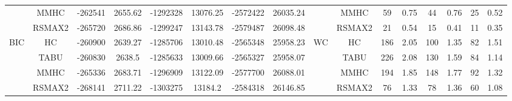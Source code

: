 \begin{table}[h]
{\begin{tabular}{cc||cc|cc|cc||cc|cc|cc|cc}
& MMHC &	-262541 & 	2655.62 & 	-1292328 & 	13076.25 & 	-2572422 & 	26035.24 & 	& MMHC &	59 & 	0.75 & 	44 & 	0.76 & 	25 & 	0.52\tabularnewline													
& RSMAX2 &	-265720 & 	2686.86 & 	-1299247 & 	13143.78 & 	-2579487 & 	26098.48 & 	& RSMAX2 &	21 & 	0.54 & 	15 & 	0.41 & 	11 & 	0.35\tabularnewline													
\hline																										
\multirow{4}{*}{BIC} & HC &	-260900 & 	2639.27 & 	-1285706 & 	13010.48 & 	-2565348 & 	25958.23 & 	\multirow{4}{*}{WC} & HC &	186 & 	2.05 & 	100 & 	1.35 & 	82 & 	1.51\tabularnewline													
& TABU &	-260830 & 	2638.5 & 	-1285633 & 	13009.66 & 	-2565327 & 	25958.07 & 	& TABU &	226 & 	2.08 & 	130 & 	1.59 & 	84 & 	1.14\tabularnewline													
& MMHC &	-265336 & 	2683.71 & 	-1296909 & 	13122.09 & 	-2577700 & 	26088.01 & 	& MMHC &	194 & 	1.85 & 	148 & 	1.77 & 	92 & 	1.32\tabularnewline													
& RSMAX2 &	-268141 & 	2711.22 & 	-1303275 & 	13184.2 & 	-2584318 & 	26146.85 & 	& RSMAX2 &	76 & 	1.33 & 	78 & 	1.36 & 	60 & 	1.08\tabularnewline													
\hline																										
\end{tabular}																										
}																										
\end{table}																										
